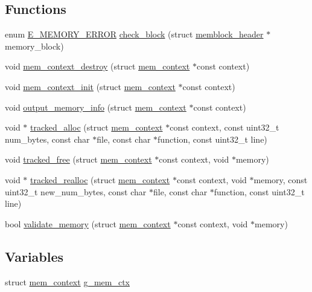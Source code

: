 \subsection*{Functions}
\begin{DoxyCompactItemize}
\item 
enum \hyperlink{tracked__memory_8h_adc7040deea27628dba424c534b71dbbf}{E\-\_\-\-M\-E\-M\-O\-R\-Y\-\_\-\-E\-R\-R\-O\-R} \hyperlink{tracked__memory_8h_ab753a667917e4aa67a8e5ee2117083ba}{check\-\_\-block} (struct \hyperlink{structmemblock__header}{memblock\-\_\-header} $\ast$memory\-\_\-block)
\item 
void \hyperlink{tracked__memory_8h_a18ea1d9235496d3eeefa9e5ef683a7a1}{mem\-\_\-context\-\_\-destroy} (struct \hyperlink{structmem__context}{mem\-\_\-context} $\ast$const context)
\item 
void \hyperlink{tracked__memory_8h_a0a67a6685295c0e8f0d891fe56353b4d}{mem\-\_\-context\-\_\-init} (struct \hyperlink{structmem__context}{mem\-\_\-context} $\ast$const context)
\item 
void \hyperlink{tracked__memory_8h_a1ed5a096e4418b4468d1f6eb94fe953a}{output\-\_\-memory\-\_\-info} (struct \hyperlink{structmem__context}{mem\-\_\-context} $\ast$const context)
\item 
void $\ast$ \hyperlink{tracked__memory_8h_a060364772083abaaf94eee077a5d3365}{tracked\-\_\-alloc} (struct \hyperlink{structmem__context}{mem\-\_\-context} $\ast$const context, const uint32\-\_\-t num\-\_\-bytes, const char $\ast$file, const char $\ast$function, const uint32\-\_\-t line)
\item 
void \hyperlink{tracked__memory_8h_adaadfc4aa30023606455c7f940868825}{tracked\-\_\-free} (struct \hyperlink{structmem__context}{mem\-\_\-context} $\ast$const context, void $\ast$memory)
\item 
void $\ast$ \hyperlink{tracked__memory_8h_a4e46491d14d0a28b73e4758cc2b20d3b}{tracked\-\_\-realloc} (struct \hyperlink{structmem__context}{mem\-\_\-context} $\ast$const context, void $\ast$memory, const uint32\-\_\-t new\-\_\-num\-\_\-bytes, const char $\ast$file, const char $\ast$function, const uint32\-\_\-t line)
\item 
bool \hyperlink{tracked__memory_8h_a1f0ff25556f5435b8c7048f58b3c80a9}{validate\-\_\-memory} (struct \hyperlink{structmem__context}{mem\-\_\-context} $\ast$const context, void $\ast$memory)
\end{DoxyCompactItemize}
\subsection*{Variables}
\begin{DoxyCompactItemize}
\item 
struct \hyperlink{structmem__context}{mem\-\_\-context} \hyperlink{tracked__memory_8h_a7d7857f56a1eceeb304e53870738e18f}{g\-\_\-mem\-\_\-ctx}
\end{DoxyCompactItemize}


